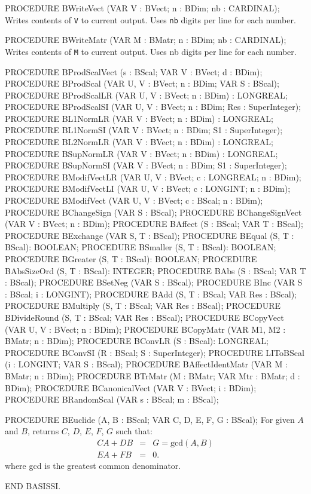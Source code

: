 PROCEDURE BWriteVect (VAR V : BVect;  n : BDim;  nb : CARDINAL);
\endcode
  \tab  Writes contents of {\tt V} to current output.
        Uses {\tt nb} digits per line for each number.  \endtab
\code

PROCEDURE BWriteMatr (VAR M : BMatr;  n : BDim;  nb : CARDINAL);
\endcode
  \tab  Writes contents of {\tt M} to current output.
        Uses nb digits per line for each number.  \endtab
\code

PROCEDURE BProdScalVect (s : BScal;  VAR V : BVect;  d : BDim);
PROCEDURE BProdScal (VAR U, V : BVect;  n : BDim;  VAR S : BScal);
PROCEDURE BProdScalLR (VAR U, V : BVect;  n : BDim) : LONGREAL;
PROCEDURE BProdScalSI (VAR U, V : BVect; n : BDim; Res : SuperInteger);
\endcode
\code
PROCEDURE BL1NormLR (VAR V : BVect;  n : BDim) : LONGREAL;
PROCEDURE BL1NormSI (VAR V : BVect;  n : BDim;  S1 : SuperInteger);
PROCEDURE BL2NormLR (VAR V : BVect;  n : BDim) : LONGREAL;
PROCEDURE BSupNormLR (VAR V : BVect;  n : BDim) : LONGREAL;
PROCEDURE BSupNormSI (VAR V : BVect;  n : BDim;  S1 : SuperInteger);
\endcode
\code
PROCEDURE BModifVectLR (VAR U, V : BVect;  c : LONGREAL;  n : BDim);
PROCEDURE BModifVectLI (VAR U, V : BVect;  c : LONGINT;  n : BDim);
PROCEDURE BModifVect (VAR U, V : BVect;  c : BScal;  n : BDim);
\endcode
\code
PROCEDURE BChangeSign (VAR S : BScal);
PROCEDURE BChangeSignVect (VAR V : BVect;  n : BDim);
PROCEDURE BAffect (S : BScal;  VAR T : BScal);
PROCEDURE BExchange (VAR S, T : BScal);
\endcode
\code
PROCEDURE BEqual (S, T : BScal): BOOLEAN;
PROCEDURE BSmaller (S, T : BScal): BOOLEAN;
PROCEDURE BGreater (S, T : BScal): BOOLEAN;
\endcode
\code
PROCEDURE BAbsSizeOrd (S, T : BScal): INTEGER;
PROCEDURE BAbs (S : BScal; VAR T : BScal);
PROCEDURE BSetNeg (VAR S : BScal);
PROCEDURE BInc (VAR S : BScal; i : LONGINT);
PROCEDURE BAdd (S, T : BScal; VAR Res : BScal);
PROCEDURE BMultiply (S, T : BScal; VAR Res : BScal);
PROCEDURE BDivideRound (S, T : BScal; VAR Res : BScal);
PROCEDURE BCopyVect (VAR U, V : BVect;  n : BDim);
PROCEDURE BCopyMatr (VAR M1, M2 : BMatr;  n : BDim);
PROCEDURE BConvLR (S : BScal): LONGREAL;
PROCEDURE BConvSI (R : BScal; S : SuperInteger);
PROCEDURE LIToBScal (i : LONGINT; VAR S : BScal);
PROCEDURE BAffectIdentMatr (VAR M : BMatr;  n : BDim);
PROCEDURE BTrMatr (M : BMatr; VAR Mtr : BMatr; d : BDim);
PROCEDURE BCanonicalVect (VAR V : BVect; i : BDim);
PROCEDURE BRandomScal (VAR s : BScal; m : BScal);

PROCEDURE BEuclide (A, B : BScal;  VAR C, D, E, F, G : BScal);
\endcode
  \tab For given $A$ and $B$, returns $C$, $D$, $E$, $F$, $G$ such that: 
   \begin {eqnarray*}
     C  A + D  B  &=& G = \mbox{gcd} (A,B) \\
     E  A + F  B  &=& 0.
   \end {eqnarray*}
where {gcd}  is the greatest common denominator.
  \endtab
\code

END BASISSI.
\endcode
